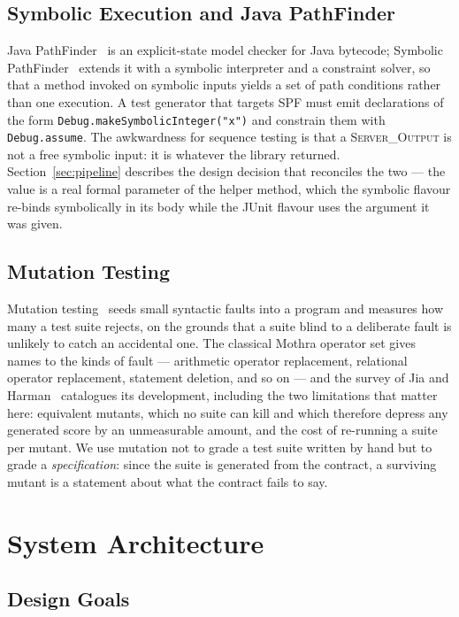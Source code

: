 \documentclass[conference]{IEEEtran}
\begin{document}
\subsection{Symbolic Execution and Java PathFinder}

Java PathFinder~\cite{b2} is an explicit-state model checker for Java bytecode;
Symbolic PathFinder~\cite{b3} extends it with a symbolic interpreter and a
constraint solver, so that a method invoked on symbolic inputs yields a set of path
conditions rather than one execution. A test generator that targets SPF must emit
declarations of the form \texttt{Debug.makeSymbolicInteger("x")} and constrain them
with \texttt{Debug.assume}. The awkwardness for sequence testing is that a
\textsc{Server\_Output} is not a free symbolic input: it is whatever the library
returned. Section~\ref{sec:pipeline} describes the design decision that reconciles
the two --- the value is a real formal parameter of the helper method, which the
symbolic flavour re-binds symbolically in its body while the JUnit flavour uses the
argument it was given.

\subsection{Mutation Testing}

Mutation testing~\cite{b4} seeds small syntactic faults into a program and measures
how many a test suite rejects, on the grounds that a suite blind to a deliberate
fault is unlikely to catch an accidental one. The classical Mothra operator set
gives names to the kinds of fault --- arithmetic operator replacement, relational
operator replacement, statement deletion, and so on --- and the survey of
Jia and Harman~\cite{b5} catalogues its development, including the two limitations
that matter here: equivalent mutants, which no suite can kill and which therefore
depress any generated score by an unmeasurable amount, and the cost of re-running
a suite per mutant. We use mutation not to grade a test suite written by hand but
to grade a \emph{specification}: since the suite is generated from the contract,
a surviving mutant is a statement about what the contract fails to say.

\section{System Architecture}
\label{sec:arch}

\subsection{Design Goals}
\end{document}
